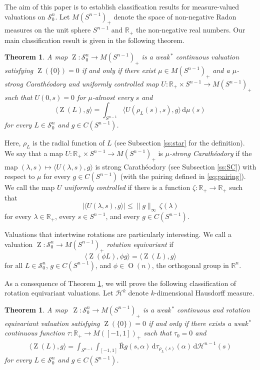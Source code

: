 \documentclass[11pt, a4paper]{amsart}
\newtheorem{theorem}[proposition]{Theorem}
\renewcommand{\d}{\,\mathrm{d}}
\newcommand{\hn}{\mathcal H^{n-1}}
\newcommand{\cm}{\zeta}
\newcommand{\rp}{\mathbb R_{\scriptscriptstyle +}}
\newcommand{\sn}{{S^{n-1}}}
\newcommand{\on}{\operatorname{O}(n)}
\renewcommand{\d}{\,\mathrm{d}}
\newcommand{\oZ}{\operatorname{Z}}
\newcommand{\starn}{\mathcal S_{\scriptscriptstyle 0}^n}
\newcommand{\measn}{M(\sn )_{\scriptscriptstyle +}}
\newcommand{\rn}{\mathbb R^n}
\newcommand{\somename}{strong Cara\-th\'eo\-dory and uniformly controlled }
\newcommand{\radon}{\operatorname{\overline R}}
\newcommand{\rhot}{\tau}
\begin{document}
The aim of this paper is to establish classification results for measure-valued valuations on $\starn$. Let $\measn$ denote the space of non-negative Radon measures on the unit sphere $\sn$ and $\rp$ the non-negative real numbers. Our main classification result is given in the following theorem.   
\goodbreak

\begin{theorem}\label{th:rep}
A map $\oZ\colon  \starn \to \measn$ is a weak$^{\,*}\!$ continuous valuation satisfying $\oZ(\{0\})=0$ if and only if there exist %
$\mu\in \measn$ and a $\mu$-\somename map $U\colon \rp \times \sn  \to \measn$ such that $U(0,s)=0$ for $\mu$-almost every $s$ and 
$$\langle \oZ(L),g\rangle  =\int_{\sn } \langle U(\rho_L(s), s),g\rangle  \d\mu(s)$$
for every $L\in \starn$ and $g\in C(\sn)$. 
\end{theorem}

\noindent
Here, $\rho_L$ is the radial function of $L$ (see Subsection \ref{ss:star} for the definition). We say that a map
$U\colon \rp \times \sn  \to \measn$ is \emph{$\mu$-strong Carath\'eodory} if the map $(\lambda, s)\mapsto \langle U(\lambda, s),g\rangle$ is strong Carath\'eodory (see Subsection \ref{ss:SC}) with respect to $\mu$ for every $g\in C(\sn)$ (with the pairing  defined in \eqref{eq:pairing}).
We call the map $U$ \emph{uniformly controlled} if  
there is a function $ \cm\colon \rp \to \rp$ such that
$$\vert \langle U(\lambda, s), g\rangle\vert \leq \|g\|_{\scriptscriptstyle \infty}\, \cm(\lambda)$$
for every $\lambda\in\rp$, every $s\in\sn$, and every $g\in C(\sn )$.  
\goodbreak


Valuations that intertwine rotations are particularly interesting. We call a valuation  
$\oZ\colon \starn \to \measn$ \emph{rotation equivariant} if 
$$\langle \oZ(\phi L),\phi g\rangle = \langle \oZ(L),g\rangle $$ 
for all $L\in\starn$, $g\in C(\sn)$, and $\phi\in\on$, the orthogonal group in $\rn$. 

As a consequence of Theorem \ref{th:rep}, we will  
prove the following  
classification of rotation equivariant valuations.
Let $\mathcal H^k$ denote $k$-dimensional Hausdorff measure.

\begin{theorem}\label{th:rep equivariant}
A map $\,\oZ\colon  \starn\to \measn$ is a weak$^{\,*}\!$ continuous and rotation equivariant valuation satisfying $\oZ(\{0\})=0 $ if and only if there exists a weak$^{\,*}\!$ continuous function $\rhot\colon  \rp \to M([-1,1])_{\scriptscriptstyle +}$ such that $\rhot_0=0$ and
\begin{align*}
\langle \oZ (L),g\rangle= \int_\sn \int_{[-1,1]}\radon g(s,\alpha)\d\rhot_{\rho_L(s)}(\alpha)\d\hn(s) 
\end{align*}
for every $L\in\starn$ and $g\in C(\sn)$. 
\end{theorem}
\end{document}
